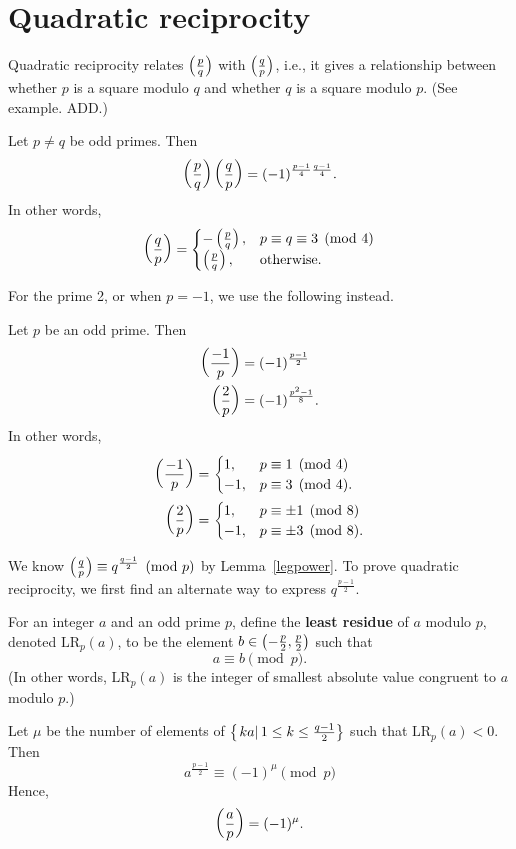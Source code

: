 \section{Quadratic reciprocity}
Quadratic reciprocity relates $\left( {\frac{p}{q}} \right)$ with $\left( {\frac{q}{p}} \right)$, i.e., it gives a relationship between whether $p$ is a square modulo $q$ and whether $q$ is a square modulo $p$. (See example. ADD.)
\begin{thm}\label{qr}
Let $p\ne q$ be odd primes. Then
\[
\left( {\frac{p}{q}} \right)\left( {\frac{q}{p}} \right)=(-1)^{\frac{p-1}{4}\frac{q-1}{4}}.
\]
In other words,
\[
\left( {\frac{q}{p}} \right)=\begin{cases}
-\left( {\frac{p}{q}} \right),&p\equiv q\equiv 3\pmod 4\\
\left( {\frac{p}{q}} \right),&\text{otherwise.}
\end{cases}
\]
\end{thm}
For the prime 2, or when $p=-1$, we use the following instead.
\begin{thm}\label{qr2}
Let $p$ be an odd prime. Then
\begin{align*}
\left( {\frac{-1}{p}} \right)&=(-1)^{\frac{p-1}2}\\
\left( {\frac{2}{p}} \right)&=(-1)^{\frac{p^2-1}{8}}.
\end{align*}
In other words,
\begin{align*}
\left( {\frac{-1}{p}} \right)&=\begin{cases}
1,&p\equiv 1\pmod 4\\
-1,&p\equiv 3\pmod 4.
\end{cases}\\
\left( {\frac{2}{p}} \right)&=\begin{cases}
1,&p\equiv \pm1\pmod 8\\
-1,&p\equiv \pm3\pmod 8.
\end{cases}
\end{align*}
\end{thm}
We know $\left( {\frac{q}{p}} \right)\equiv q^{\frac{q-1}{2}}\pmod{p}$ by Lemma~\ref{legpower}. To prove quadratic reciprocity, we first find an alternate way to express $q^{\frac{p-1}{2}}$.
\begin{lem}\label{gauss-leg}
For an integer $a$ and an odd prime $p$, define the \textbf{least residue} of $a$ modulo $p$, denoted $\text{LR}_p(a)$, to be the element $b\in \left( {-\frac p2,\frac p2} \right)$ such that
\[
a\equiv b\pmod{p}.
\]
(In other words, $\text{LR}_p(a)$ is the integer of smallest absolute value congruent to $a$ modulo $p$.)

Let $\mu$ be the number of elements of $\left\{\left.{ka}\right|{1\le k\le \frac{q-1}{2}}\right\}$ such that $\text{LR}_p(a)<0$. Then
\[
a^{\frac{p-1}{2}}\equiv (-1)^{\mu}\pmod{p}
\]
Hence,
\[
\left( {\frac{a}{p}} \right)=(-1)^{\mu}.
\]
\end{lem}

